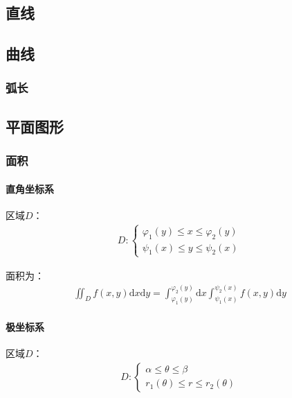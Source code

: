\documentclass[12pt]{book}
\begin{document}
\subsection{直线}


\subsection{曲线}


\subsubsection{弧长}


\subsection{平面图形}






\subsubsection{面积}



\paragraph{直角坐标系}



区域$D$：
\begin{gather*}
    D: \begin{cases}
        \varphi_{1}(y)\leqslant x\leqslant\varphi_{2}(y) \\
        \psi_{1}(x)\leqslant y\leqslant \psi_{2}(x)
    \end{cases}
\end{gather*}

面积为：
\begin{gather*}
    \iint_{D}{f(x,y)\mathrm{d}x\mathrm{d}y } 
    = 
    \int_{\varphi_{1}(y)}^{\varphi_{2}(y)}\mathrm{d}x
    \int_{\psi_{1}(x)}^{\psi_{2}(x)}{f(x,y) \mathrm{d}y }
\end{gather*}




\paragraph{极坐标系}



区域$D$：
\begin{gather*}
    D: \begin{cases}
        \alpha\leqslant\theta\leqslant\beta \\
        r_{1}(\theta)\leqslant r\leqslant r_{2}(\theta)
    \end{cases}
\end{gather*}
\end{document}
